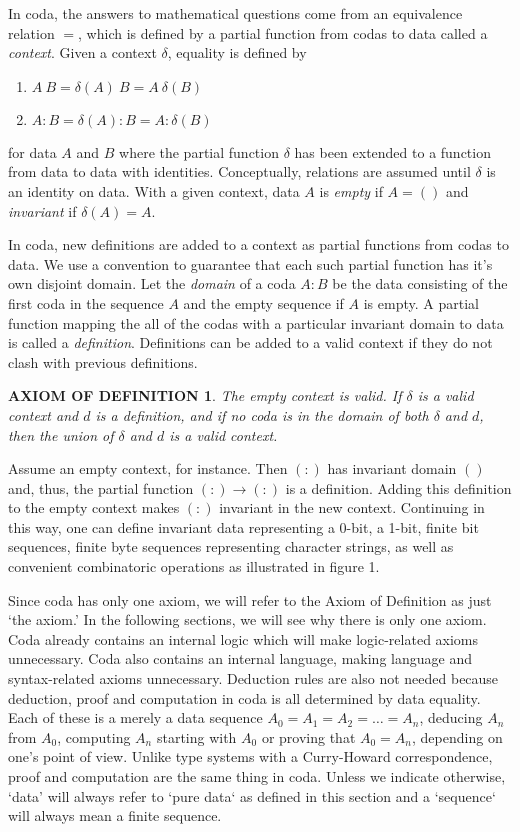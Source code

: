 \documentclass[11pt]{article}
\begin{document}
     In coda, the answers to mathematical questions come from an equivalence relation $=$, which is defined by a partial function from codas to data
called a {\it context}.  Given a context $\delta$, equality is defined by
\begin{enumerate}
\item[] $A\ B = \delta(A)\ B = A\ \delta(B)$
\item[] $A:B = \delta(A):B = A:\delta(B)$
\end{enumerate}
for data $A$ and $B$ where the partial function $\delta$ has been extended to a function from data to data with identities.
Conceptually, relations are assumed until $\delta$ is an identity on data.  With a given context, data $A$ is {\it empty} if $A=()$ and {\it invariant}
if $\delta(A)=A$.

     In coda, new definitions are added to a context as partial functions from codas to data.  We use a convention to guarantee that each such partial
function has it's own disjoint domain.  Let the {\it domain} of a coda $A:B$ be the data consisting of the first coda in the sequence $A$ and the empty
sequence if $A$ is empty.  A partial function mapping the all of the codas with a particular invariant domain to data is called a {\it definition}.  Definitions
can be added to a valid context if they do not clash with previous definitions.

\newtheorem*{remark}{AXIOM OF DEFINITION}
\begin{remark}  The empty context is valid.  If $\delta$ is a valid context and $d$ is a definition, and if no coda is in
the domain of both $\delta$ and $d$, then the union of $\delta$ and $d$ is a valid context.
\end{remark}

\noindent Assume an empty context, for instance.  Then $(:)$ has invariant domain $()$ and, thus, the partial function $(:)\rightarrow (:)$ is a definition.
Adding this definition to the empty context makes $(:)$ invariant in the new context.  Continuing in this way, one can define invariant data
representing a 0-bit, a 1-bit, finite bit sequences, finite byte sequences representing character strings, as well as convenient combinatoric operations as
illustrated in figure 1.

    Since coda has only one axiom, we will refer to the Axiom of Definition as just `the axiom.'  In the following sections, we will see why there is only
one axiom.  Coda already contains an internal logic which will make logic-related axioms unnecessary.  Coda also contains an internal language, making
language and syntax-related axioms unnecessary.  Deduction rules are also not needed because deduction, proof and computation in coda is all determined
by data equality.  Each of these is a merely a data sequence $A_0=A_1=A_2=\dots=A_n$, deducing $A_n$ from $A_0$, computing
$A_n$ starting with $A_0$ or proving that $A_0=A_n$, depending on one's point of view.  Unlike type systems with a Curry-Howard correspondence, proof and computation are the same thing in coda.  Unless we indicate otherwise, `data' will always refer to `pure data` as defined in this section and
a `sequence` will always mean a finite sequence.
\end{document}
